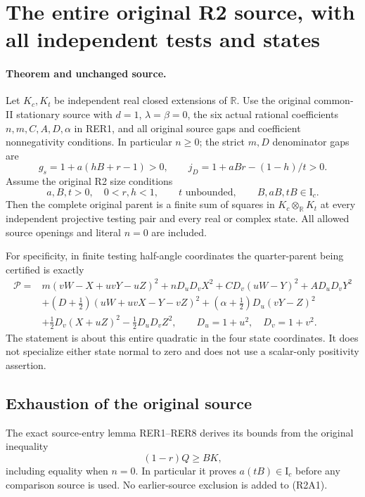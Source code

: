 \section{The entire original R2 source, with all independent tests and states}
\label{sec:r2-complete-rederived}

\paragraph{Theorem and unchanged source.}
Let \(K_c,K_t\) be independent real closed extensions of
\(\mathbb R\).  Use the original common-II stationary source
with \(d=1\), \(\lambda=\beta=0\), the six actual rational
coefficients \(n,m,C,A,D,\alpha\) in RER1, and all original
source gaps and coefficient nonnegativity conditions.
In particular \(n\geq0\); the strict \(m,D\) denominator
gaps are
\[
 g_s=1+a(hB+r-1)>0,\qquad
 j_D=1+aBr-(1-h)/t>0 .
\]
Assume the original R2 size conditions
\[
 a,B,t>0,\quad 0<r,h<1,\qquad
 t\text{ unbounded},\qquad B,aB,tB\in\mathrm I_c .
                                                               \tag{R2A1}
\]
Then the complete original parent is a finite sum of squares
in \(K_c\otimes_{\mathbb R}K_t\) at every independent projective
testing pair and every real or complex state.
All allowed source openings and literal \(n=0\) are included.

For specificity, in finite testing half-angle coordinates the
quarter-parent being certified is exactly
\[
\begin{split}
 \mathcal P={}&m(vW-X+uvY-uZ)^2+nD_uD_vX^2
       +CD_v(uW-Y)^2+AD_uD_vY^2\\
 &+(D+\tfrac12)(uW+uvX-Y-vZ)^2
       +(\alpha+\tfrac12)D_u(vY-Z)^2\\
 &+\tfrac12D_v(X+uZ)^2-\tfrac12D_uD_vZ^2,
 \qquad D_u=1+u^2,\quad D_v=1+v^2 .
\end{split}                                                     \tag{R2A2}
\]
The statement is about this entire quadratic in the four state
coordinates.  It does not specialize either state normal to zero
and does not use a scalar-only positivity assertion.

\subsection{Exhaustion of the original source}

The exact source-entry lemma RER1--RER8 derives its bounds from
the original inequality
\[
 (1-r)Q\geq BK,
\]
including equality when \(n=0\).  In particular it proves
\(a(tB)\in\mathrm I_c\) before any comparison source is used.
No earlier-source exclusion is added to (R2A1).

